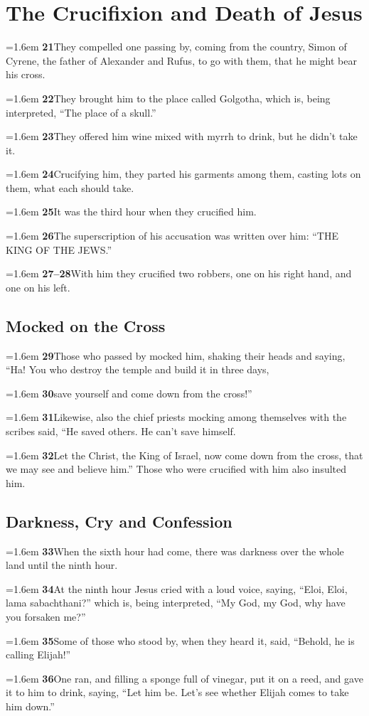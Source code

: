 \documentclass[12pt,a4paper]{article}
\newcommand{\vers}[2]{%
  \par\hangindent=1.6em\hangafter=1
  \textbf{#1}\enspace #2\par}
\begin{document}
\section*{The Crucifixion and Death of Jesus}

\vers{21}{They compelled one passing by, coming from the country, Simon of Cyrene, the father of Alexander and Rufus, to go with them, that he might bear his cross.}
\vers{22}{They brought him to the place called Golgotha, which is, being interpreted, ``The place of a skull.'' }
\vers{23}{They offered him wine mixed with myrrh to drink, but he didn't take it.}
\vers{24}{Crucifying him, they parted his garments among them, casting lots on them, what each should take.}
\vers{25}{It was the third hour when they crucified him.}
\vers{26}{The superscription of his accusation was written over him: ``THE KING OF THE JEWS.'' }
\vers{27--28}{With him they crucified two robbers, one on his right hand, and one on his left.}

\newpage

\subsection*{Mocked on the Cross}

\vers{29}{Those who passed by mocked him, shaking their heads and saying, ``Ha! You who destroy the temple and build it in three days,}
\vers{30}{save yourself and come down from the cross!''}
\vers{31}{Likewise, also the chief priests mocking among themselves with the scribes said, ``He saved others. He can't save himself.}
\vers{32}{Let the Christ, the King of Israel, now come down from the cross, that we may see and believe him.'' Those who were crucified with him also insulted him.}

\subsection*{Darkness, Cry and Confession}

\vers{33}{When the sixth hour had come, there was darkness over the whole land until the ninth hour.}
\vers{34}{At the ninth hour Jesus cried with a loud voice, saying, ``Eloi, Eloi, lama sabachthani?'' which is, being interpreted, ``My God, my God, why have you forsaken me?''}
\vers{35}{Some of those who stood by, when they heard it, said, ``Behold, he is calling Elijah!''}
\vers{36}{One ran, and filling a sponge full of vinegar, put it on a reed, and gave it to him to drink, saying, ``Let him be. Let's see whether Elijah comes to take him down.''}
\end{document}
